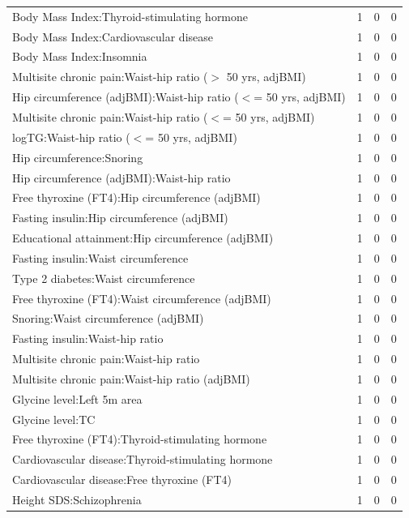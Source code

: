 \begin{table}[ht]
\begin{tabular}{lrrr}
  Body Mass Index:Thyroid-stimulating hormone &   1 &   0 &   0 \\ 
  Body Mass Index:Cardiovascular disease &   1 &   0 &   0 \\ 
  Body Mass Index:Insomnia &   1 &   0 &   0 \\ 
  Multisite chronic pain:Waist-hip ratio ($>$ 50 yrs, adjBMI) &   1 &   0 &   0 \\ 
  Hip circumference (adjBMI):Waist-hip ratio ($<$= 50 yrs, adjBMI) &   1 &   0 &   0 \\ 
  Multisite chronic pain:Waist-hip ratio ($<$= 50 yrs, adjBMI) &   1 &   0 &   0 \\ 
  logTG:Waist-hip ratio ($<$= 50 yrs, adjBMI) &   1 &   0 &   0 \\ 
  Hip circumference:Snoring &   1 &   0 &   0 \\ 
  Hip circumference (adjBMI):Waist-hip ratio &   1 &   0 &   0 \\ 
  Free thyroxine (FT4):Hip circumference (adjBMI) &   1 &   0 &   0 \\ 
  Fasting insulin:Hip circumference (adjBMI) &   1 &   0 &   0 \\ 
  Educational attainment:Hip circumference (adjBMI) &   1 &   0 &   0 \\ 
  Fasting insulin:Waist circumference &   1 &   0 &   0 \\ 
  Type 2 diabetes:Waist circumference &   1 &   0 &   0 \\ 
  Free thyroxine (FT4):Waist circumference (adjBMI) &   1 &   0 &   0 \\ 
  Snoring:Waist circumference (adjBMI) &   1 &   0 &   0 \\ 
  Fasting insulin:Waist-hip ratio &   1 &   0 &   0 \\ 
  Multisite chronic pain:Waist-hip ratio &   1 &   0 &   0 \\ 
  Multisite chronic pain:Waist-hip ratio (adjBMI) &   1 &   0 &   0 \\ 
  Glycine level:Left 5m area &   1 &   0 &   0 \\ 
  Glycine level:TC &   1 &   0 &   0 \\ 
  Free thyroxine (FT4):Thyroid-stimulating hormone &   1 &   0 &   0 \\ 
  Cardiovascular disease:Thyroid-stimulating hormone &   1 &   0 &   0 \\ 
  Cardiovascular disease:Free thyroxine (FT4) &   1 &   0 &   0 \\ 
  Height SDS:Schizophrenia &   1 &   0 &   0 \\ 

\end{tabular}
\end{table}
